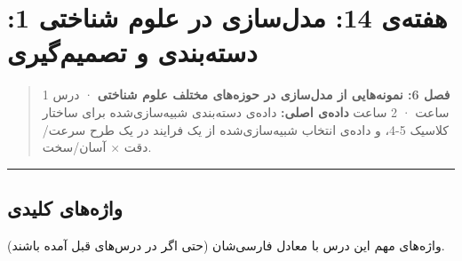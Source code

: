 \section{\texorpdfstring{هفته‌ی 14: مدل‌سازی در علوم شناختی 1: دسته‌بندی
 و تصمیم‌گیری
}{هفته‌ی 14: مدل‌سازی در علوم شناختی 1: دسته‌بندی (GCM) و تصمیم‌گیری (Drift-Diffusion)}}

\begin{quote}
\textbf{فصل 6: نمونه‌هایی از مدل‌سازی در حوزه‌های مختلف علوم شناختی} · درس
1 ساعت ·  2 ساعت \textbf{داده‌ی اصلی:} داده‌ی دسته‌بندی شبیه‌سازی‌شده
برای ساختار کلاسیک 5-4، و داده‌ی انتخاب\lr{--} شبیه‌سازی‌شده از یک فرایند
 در یک طرح سرعت/دقت × آسان/سخت.
\end{quote}

\begin{center}\rule{0.5\linewidth}{0.5pt}\end{center}

\subsection{واژه‌های کلیدی}

واژه‌های مهم این درس با معادل فارسی‌شان (حتی اگر در درس‌های قبل آمده
باشند).

